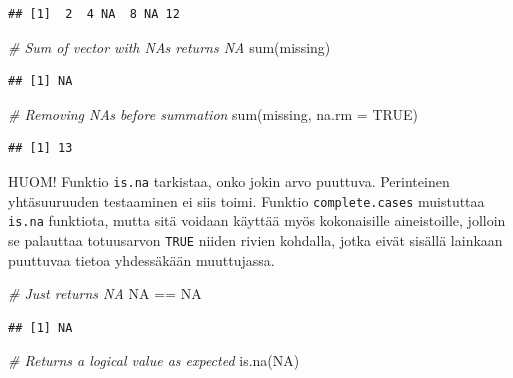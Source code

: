 \documentclass[
]{book}
\newenvironment{Shaded}{\begin{snugshade}}{\end{snugshade}}
\newcommand{\AttributeTok}[1]{\textcolor[rgb]{0.77,0.63,0.00}{#1}}
\newcommand{\CommentTok}[1]{\textcolor[rgb]{0.56,0.35,0.01}{\textit{#1}}}
\newcommand{\ConstantTok}[1]{\textcolor[rgb]{0.00,0.00,0.00}{#1}}
\newcommand{\FunctionTok}[1]{\textcolor[rgb]{0.00,0.00,0.00}{#1}}
\newcommand{\NormalTok}[1]{#1}
\newcommand{\SpecialCharTok}[1]{\textcolor[rgb]{0.00,0.00,0.00}{#1}}
\begin{document}
\begin{verbatim}
## [1]  2  4 NA  8 NA 12
\end{verbatim}

\begin{Shaded}
\begin{Highlighting}[]
\CommentTok{\# Sum of vector with NAs returns NA}
\FunctionTok{sum}\NormalTok{(missing)}
\end{Highlighting}
\end{Shaded}

\begin{verbatim}
## [1] NA
\end{verbatim}

\begin{Shaded}
\begin{Highlighting}[]
\CommentTok{\# Removing NAs before summation}
\FunctionTok{sum}\NormalTok{(missing, }\AttributeTok{na.rm =} \ConstantTok{TRUE}\NormalTok{)}
\end{Highlighting}
\end{Shaded}

\begin{verbatim}
## [1] 13
\end{verbatim}

HUOM! Funktio \texttt{is.na} tarkistaa, onko jokin arvo puuttuva. Perinteinen yhtäsuuruuden testaaminen ei siis toimi. Funktio \texttt{complete.cases} muistuttaa \texttt{is.na} funktiota, mutta sitä voidaan käyttää myös kokonaisille aineistoille, jolloin se palauttaa totuusarvon \texttt{TRUE} niiden rivien kohdalla, jotka eivät sisällä lainkaan puuttuvaa tietoa yhdessäkään muuttujassa.

\begin{Shaded}
\begin{Highlighting}[]
\CommentTok{\# Just returns NA}
\ConstantTok{NA} \SpecialCharTok{==} \ConstantTok{NA}
\end{Highlighting}
\end{Shaded}

\begin{verbatim}
## [1] NA
\end{verbatim}

\begin{Shaded}
\begin{Highlighting}[]
\CommentTok{\# Returns a logical value as expected}
\FunctionTok{is.na}\NormalTok{(}\ConstantTok{NA}\NormalTok{)}
\end{Highlighting}
\end{Shaded}
\end{document}
